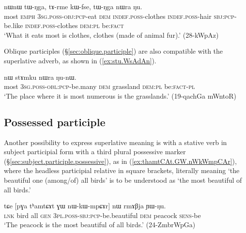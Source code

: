 \begin{exe}
\ex \label{ex:stu.Zo.WkAndza}
 nɯnɯ tɯ-ŋga, tɤ-rme kɯ-fse, tɯ-ŋga nɯra ŋu. \\
most \textsc{emph} \textsc{3sg}.\textsc{poss}-\textsc{obj}:\textsc{pcp}-eat \textsc{dem} \textsc{indef}.\textsc{poss}-clothes \textsc{indef}.\textsc{poss}-hair \textsc{sbj}:\textsc{pcp}-be.like \textsc{indef}.\textsc{poss}-clothes \textsc{dem}:\textsc{pl} be:\textsc{fact} \\
\glt `What it eats most is clothes, clothes (made of animal fur).' (28-kWpAz)
\end{exe}

Oblique participles (§\ref{sec:oblique.participle}) are also compatible with the superlative adverb, as shown in (\ref{ex:stu.WsAdAn}).

\begin{exe}
\ex \label{ex:stu.WsAdAn}
 nɯ stɤmku nɯra ŋu-nɯ.   \\
most \textsc{3sg}.\textsc{poss}-\textsc{obl}:\textsc{pcp}-be.many \textsc{dem} grassland \textsc{dem}:\textsc{pl} be:\textsc{fact}-\textsc{pl}  \\
\glt `The place where it is most numerous is the grasslands.' (19-qachGa mWntoR)
\end{exe}


 \subsection{Possessed participle} \label{sec:possessed.superlative}
Another possibility to express superlative meaning is with a stative verb in subject participial form with a third plural possessive marker (§\ref{sec:subject.participle.possessive}), as in (\ref{ex:thamtCAt.GW.nWkWmpCAr}), where the headless participial relative in square brackets, literally meaning `the beautiful one (among/of) all birds' is to be understood as `the most beautiful of all birds.' 

 \begin{exe} 
\ex \label{ex:thamtCAt.GW.nWkWmpCAr}
\gll tɕe [pɣa tʰamtɕɤt ɣɯ nɯ-kɯ-mpɕɤr] nɯ rmɤβja ɲɯ-ŋu.  \\
\textsc{lnk} bird all \textsc{gen} \textsc{3pl}.\textsc{poss}-\textsc{sbj}:\textsc{pcp}-be.beautiful \textsc{dem} peacock \textsc{sens}-be \\
\glt `The peacock is the most beautiful of all birds.' (24-ZmbrWpGa)
\end{exe}

